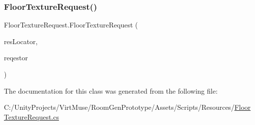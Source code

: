 \subsubsection{\texorpdfstring{Floor\+Texture\+Request()}{FloorTextureRequest()}}
{\footnotesize\ttfamily Floor\+Texture\+Request.\+Floor\+Texture\+Request (\begin{DoxyParamCaption}\item[{int}]{res\+Locator,  }\item[{Game\+Object}]{reqestor }\end{DoxyParamCaption})}



The documentation for this class was generated from the following file\+:\begin{DoxyCompactItemize}
\item 
C\+:/\+Unity\+Projects/\+Virt\+Muse/\+Room\+Gen\+Prototype/\+Assets/\+Scripts/\+Resources/\mbox{\hyperlink{_floor_texture_request_8cs}{Floor\+Texture\+Request.\+cs}}\end{DoxyCompactItemize}
